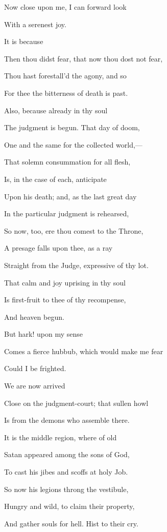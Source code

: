Now close upon me, I can forward look

With a serenest joy.


It is because

Then thou didst fear, that now thou dost not fear,

Thou hast forestall'd the agony, and so

For thee the bitterness of death is past.

Also, because already in thy soul

The judgment is begun. That day of doom,

One and the same for the collected world,—

That solemn consummation for all flesh,

Is, in the case of each, anticipate

Upon his death; and, as the last great day

In the particular judgment is rehearsed,

So now, too, ere thou comest to the Throne,

A presage falls upon thee, as a ray

Straight from the Judge, expressive of thy lot.

That calm and joy uprising in thy soul

Is first-fruit to thee of thy recompense,

And heaven begun.


But hark! upon my sense

Comes a fierce hubbub, which would make me fear

Could I be frighted.


We are now arrived

Close on the judgment-court; that sullen howl

Is from the demons who assemble there.

It is the middle region, where of old

Satan appeared among the sons of God,

To cast his jibes and scoffs at holy Job.

So now his legions throng the vestibule,

Hungry and wild, to claim their property,

And gather souls for hell. Hist to their cry.


